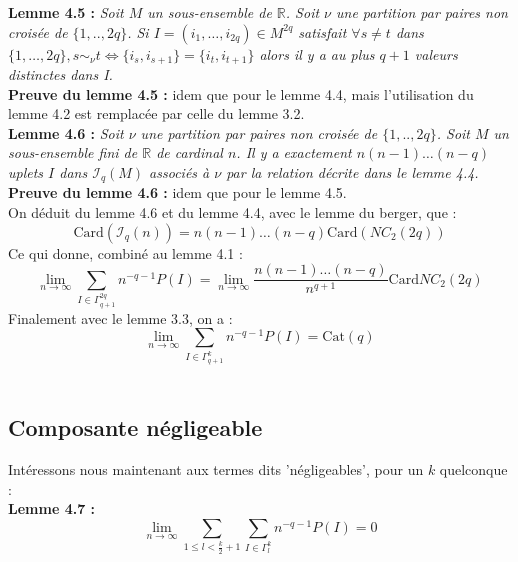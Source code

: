\documentclass[10pt,a4paper]{article}
\begin{document}
\textbf{Lemme 4.5 : }\textit{Soit $M$ un sous-ensemble de $\mathbb{R}$. Soit $\nu$ une partition par paires non croisée de $\{1,..,2q\}$. Si $ I=(i_1,\dots,i_{2q}) \in M^{2q}$ satisfait $\forall s \neq t$ dans $\{1,\dots,2q\}, s \sim_{\nu} t \Leftrightarrow \{i_s,i_{s+1}\}=\{i_t,i_{t+1}\} $ alors il y a au plus $q + 1$ valeurs distinctes dans I.}\\

\textbf{Preuve du lemme 4.5 :} idem que pour le lemme 4.4, mais l'utilisation du lemme 4.2 est remplacée par celle du lemme 3.2.\\

\textbf{Lemme 4.6 :}\textit{ Soit $\nu$ une partition par paires non croisée de $\{1,..,2q\}$. Soit $M$ un sous-ensemble fini de $\mathbb{R}$ de cardinal $n$. Il y a exactement $n(n-1)\dots (n-q)$ uplets $I$ dans $\mathcal{I}_q(M)$ associés à $\nu$ par la relation décrite dans le lemme 4.4.  }\\

\textbf{Preuve du lemme 4.6 :} idem que pour le lemme 4.5.\\


On déduit du lemme 4.6 et du lemme 4.4, avec le lemme du berger, que : 
\[ \text{Card}( \mathcal{I}_q(n) )= n(n-1)\dots(n-q)\text{Card}(NC_2(2q))\] 
Ce qui donne, combiné au lemme 4.1 :
\[\lim_{n \to \infty} \sum_{I \in \Gamma^{2q}_{q+1} } n^{-q-1}P(I) = \lim_{n \to \infty} \frac{n(n-1)\dots(n-q)}{n^{q+1}}\text{Card}NC_2(2q) \]
Finalement avec le lemme 3.3, on a :
\[\lim_{n \to \infty} \sum_{I \in \Gamma^{k}_{q+1} } n^{-q-1}P(I) = \text{Cat}(q)\]\\

\subsection{Composante négligeable}

Intéressons nous maintenant aux termes dits 'négligeables', pour un $k$ quelconque :\\

\textbf{Lemme 4.7 :}
\[\lim_{n \to \infty} \sum_{1 \leq l < \frac{k}{2} + 1} \sum_{I \in \Gamma^{k}_{l}  } n^{-q-1}P(I) = 0\]
\end{document}

